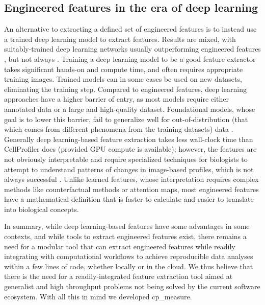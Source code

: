 \documentclass{article}
\begin{document}
\subsection{Engineered features in the era of deep learning}
\label{sec:org9dc3dfa}
An alternative to extracting a defined set of engineered features is to instead use a trained deep learning model to extract features. Results are mixed, with suitably-trained deep learning networks usually outperforming engineered features \cite{lafargeCapturingSingleCellPhenotypic2019,moshkovLearningRepresentationsImagebased2022,chowPredictingDrugPolypharmacology2022,wolfSCANPYLargescaleSinglecell2018}, but not always \cite{tangMorphologicalProfilingDrug2024,kimSelfsupervisionAdvancesMorphological2023}. Training a deep learning model to be a good feature extractor takes significant hands-on and compute time, and often requires appropriate training images. Trained models can in some cases be used on new datasets, eliminating the training step. Compared to engineered features, deep learning approaches have a higher barrier of entry, as most models require either annotated data or a large and high-quality dataset. Foundational models, whose goal is to lower this barrier, fail to generalize well for out-of-distribution (that which comes from different phenomena from the training datasets) data \cite{azadFoundationalModelsMedical2023}. Generally deep learning-based feature extraction takes less wall-clock time than CellProfiler does (provided GPU compute is available); however, the features are not obviously interpretable and require specialized techniques for biologists to attempt to understand patterns of changes in image-based profiles, which is not always successful \citep{liChallengesOpportunitiesBioimage2023}.  Unlike learned features, whose interpretation requires complex methods like counterfactual methods or attention maps, most engineered features have a mathematical definition that is faster to calculate and easier to translate into biological concepts. 

In summary, while deep learning-based features have some advantages in some contexts, and while tools to extract engineered features exist, there remains a need for a modular tool that can extract engineered features while readily integrating with computational workflows to achieve reproducible data analyses within a few lines of code, whether locally or in the cloud. We thus believe that there is the need for a readily-integrated feature extraction tool aimed at generalist and high throughput problems not being solved by the current software ecosystem. With all this in mind we developed cp\_measure.
\end{document}
